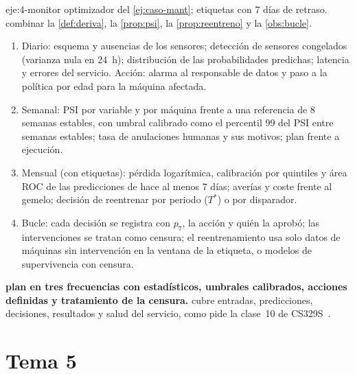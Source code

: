 \begin{solucion}{eje:4-monitor}
\datos optimizador del \cref{ej:caso-mant}; etiquetas con 7 días de retraso.
\planteamiento combinar la \cref{def:deriva}, la \cref{prop:psi}, la \cref{prop:reentreno} y la \cref{obs:bucle}.
\pasos
\begin{enumerate}[label=\arabic*.]
  \item Diario: esquema y ausencias de los sensores; detección de sensores congelados (varianza nula en 24~h); distribución de las probabilidades predichas; latencia y errores del servicio. Acción: alarma al responsable de datos y paso a la política por edad para la máquina afectada.
  \item Semanal: PSI por variable y por máquina frente a una referencia de 8 semanas estables, con umbral calibrado como el percentil 99 del PSI entre semanas estables; tasa de anulaciones humanas y sus motivos; plan frente a ejecución.
  \item Mensual (con etiquetas): pérdida logarítmica, calibración por quintiles y área ROC de las predicciones de hace al menos 7 días; averías y coste frente al gemelo; decisión de reentrenar por periodo ($T^{*}$) o por disparador.
  \item Bucle: cada decisión se registra con $p_7$, la acción y quién la aprobó; las intervenciones se tratan como censura; el reentrenamiento usa solo datos de máquinas sin intervención en la ventana de la etiqueta, o modelos de supervivencia con censura.
\end{enumerate}
\resultado \textbf{plan en tres frecuencias con estadísticos, umbrales calibrados, acciones definidas y tratamiento de la censura.}
\comprobacion cubre entradas, predicciones, decisiones, resultados y salud del servicio, como pide la clase~10 de CS329S~\cite{cs329s}.
\end{solucion}

\section{Tema 5}

